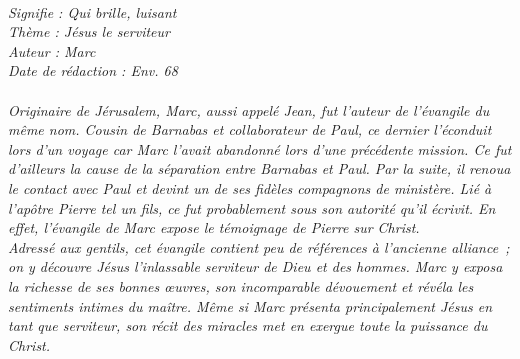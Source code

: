 \BFont
\noindent\hrulefill
{\footnotesize
\textit{
\bigskip
{\centering{}
\\Signifie : Qui brille, luisant
\\Thème : Jésus le serviteur
\\Auteur : Marc
\\Date de rédaction : Env. 68\\}
}
\textit{
\\Originaire de Jérusalem, Marc, aussi appelé Jean, fut l’auteur de l’évangile du même nom. Cousin de Barnabas et collaborateur de Paul, ce dernier l’éconduit lors d’un voyage car Marc l’avait abandonné lors d’une précédente mission. Ce fut d’ailleurs la cause de la séparation entre Barnabas et Paul.  Par la suite, il renoua le contact avec Paul et devint un de ses fidèles compagnons de ministère. Lié à l’apôtre Pierre tel un fils, ce fut probablement sous son autorité qu’il écrivit. En effet, l’évangile de Marc expose le témoignage de Pierre sur Christ.
\\Adressé aux gentils, cet évangile contient peu de références à l’ancienne alliance ; on y découvre Jésus l’inlassable serviteur de Dieu et des hommes. Marc y exposa la richesse de ses bonnes œuvres, son incomparable dévouement et révéla les sentiments intimes du maître. Même si Marc présenta principalement Jésus en tant que serviteur, son récit des miracles met en exergue toute la puissance du Christ.\bigskip
}
}
\par\nobreak\noindent\hrulefill
